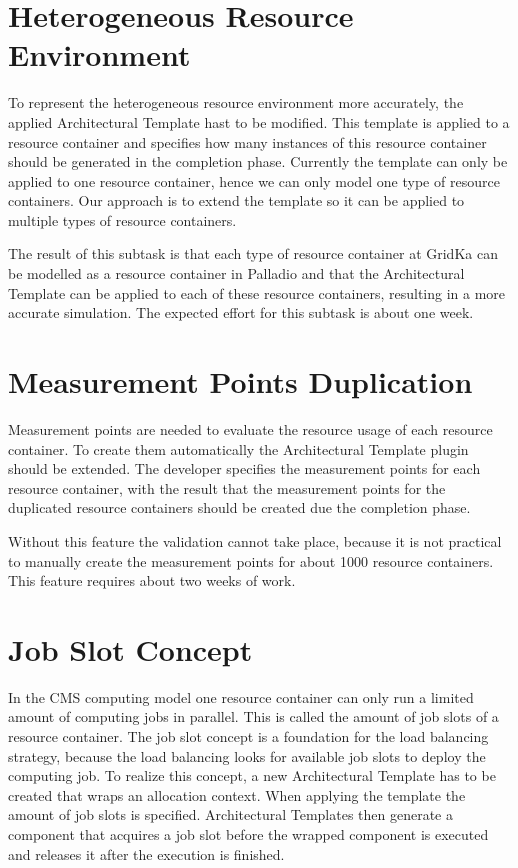 \section{Heterogeneous Resource Environment}
To represent the heterogeneous resource environment more accurately, the applied Architectural Template hast to be modified.
This template is applied to a resource container and specifies how many instances of this resource container should be generated in the completion phase.
Currently the template can only be applied to one resource container, hence we can only model one type of resource containers. Our approach is to extend the template so it can be applied to multiple types of resource containers.

The result of this subtask is that each type of resource container at GridKa can be modelled as a resource container in Palladio and that the Architectural Template can be applied to each of these resource containers, resulting in a more accurate simulation.
The expected effort for this subtask is about one week.

\section{Measurement Points Duplication}
Measurement points are needed to evaluate the resource usage of each resource container. To create them automatically the Architectural Template plugin should be extended. The developer specifies the measurement points for each resource container, with the result that the measurement points for the duplicated resource containers should be created due the completion phase.

Without this feature the validation cannot take place, because it is not practical to manually create the measurement points for about 1000 resource containers. This feature requires about two weeks of work.

\section{Job Slot Concept}
In the CMS computing model one resource container can only run a limited amount of computing jobs in parallel. This is called the amount of job slots of a resource container. The job slot concept is a foundation for the load balancing strategy, because the load balancing looks for available job slots to deploy the computing job. To realize this concept, a new Architectural Template has to be created that wraps an allocation context. When applying the template the amount of job slots is specified. Architectural Templates then generate a component that acquires a job slot before the wrapped component is executed and releases it after the execution is finished.

